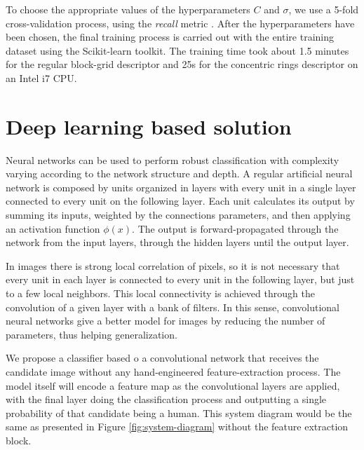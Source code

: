       To choose the appropriate values of the hyperparameters $C$ and $\sigma$, we use a 5-fold cross-validation process, using the \textit{recall} metric \cite{evaluationMetrics}. After the hyperparameters have been chosen, the final training process is carried out with the entire training dataset using the Scikit-learn \cite{scikit-learn} toolkit. The training time took about 1.5 minutes for the regular block-grid descriptor and 25s for the concentric rings descriptor on an Intel i7 CPU.


\section{Deep learning based solution}
\label{sec:deep}

    Neural networks can be used to perform robust classification with complexity varying according to the network structure and depth. A regular artificial neural network is composed by units organized in layers with every unit in a single layer connected to every unit on the following layer. Each unit calculates its output by summing its inputs, weighted by the connections parameters, and then applying an activation function $\phi(x)$. The output is forward-propagated through the network from the input layers, through the hidden layers until the output layer.

    In images there is strong local correlation of pixels, so it is not necessary that every unit in each layer is connected to every unit in the following layer, but just to a few local neighbors. This local connectivity is achieved through the convolution of a given layer with a bank of filters. In this sense, convolutional neural networks give a better model for images by reducing the number of parameters, thus helping generalization.

    We propose a classifier based o a convolutional network that receives the candidate image without any hand-engineered feature-extraction process. The model itself will encode a feature map as the convolutional layers are applied, with the final layer doing the classification process and outputting a single probability of that candidate being a human. This system diagram would be the same as presented in Figure \ref{fig:system-diagram} without the feature extraction block.


